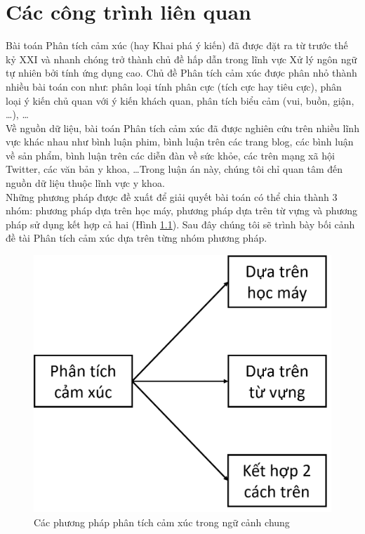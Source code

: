 \chapter{Các công trình liên quan}
\thispagestyle{empty}
Bài toán Phân tích cảm xúc (hay Khai phá ý kiến) đã được đặt ra từ trước thế kỷ XXI và nhanh chóng trở thành chủ đề hấp dẫn trong lĩnh vực Xử lý ngôn ngữ tự nhiên bởi tính ứng dụng cao. Chủ đề Phân tích cảm xúc được phân nhỏ thành nhiều bài toán con như: phân loại tính phân cực (tích cực hay tiêu cực), phân loại ý kiến chủ quan với ý kiến khách quan, phân tích biểu cảm (vui, buồn, giận, \ldots), \ldots\\

Về nguồn dữ liệu, bài toán Phân tích cảm xúc đã được nghiên cứu trên nhiều lĩnh vực khác nhau như bình luận phim, bình luận trên các trang blog, các bình luận về sản phẩm, bình luận trên các diễn đàn về sức khỏe, các  trên mạng xã hội Twitter, các văn bản y khoa, \ldots Trong luận án này, chúng tôi chỉ quan tâm đến nguồn dữ liệu thuộc lĩnh vực y khoa.\\

Những phương pháp được đề xuất để giải quyết bài toán có thể chia thành 3 nhóm\cite{Silva2015}: phương pháp dựa trên học máy, phương pháp dựa trên từ vựng và phương pháp sử dụng kết hợp cả hai (Hình \ref{fig:cac-pp-phan-tich}). Sau đây chúng tôi sẽ trình bày bối cảnh đề tài Phân tích cảm xúc dựa trên từng nhóm phương pháp.
\begin{figure}
\centering
\includegraphics[scale=0.25]{../hinh/cac_pp_phan_tich.png}
\caption{Các phương pháp phân tích cảm xúc trong ngữ cảnh chung}
\label{fig:cac-pp-phan-tich}
\end{figure}
\pagebreak
